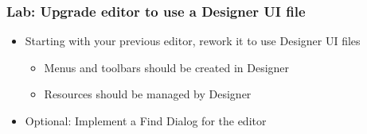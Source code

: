 \begin{slide}
\frametitle{Lab: Upgrade editor to use a Designer UI file}
\begin{itemize}
\item Starting with your previous editor, rework it to use Designer UI files
  \begin{itemize}
  \item Menus and toolbars should be created in Designer
  \item Resources should be managed by Designer
  \end{itemize}
\item Optional: Implement a Find Dialog for the editor
\end{itemize} 
\end{slide}


